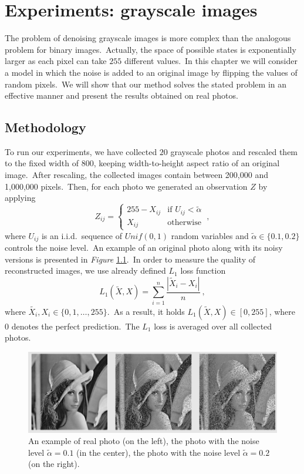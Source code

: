 \documentclass[shortabstract, english, lic]{iithesis}
\newcommand\numberedchapter[1]{\setlength\topskip{3cm}\chapter{#1}\setlength\topskip{0cm}}
\theoremstyle{default_theorem_style}\newtheorem{theorem}{Theorem}
\theoremstyle{default_theorem_style}\newtheorem{definition}{Definition}
\begin{document}
\numberedchapter{Experiments: grayscale images}\label{chapter:grayscale_experiments}

The problem of denoising grayscale images is more complex than the analogous problem for binary
images.\ Actually, the space of possible states is exponentially larger as each pixel can take $255$ different
values.\ In this chapter we will consider a model in which the noise is added to an original image by flipping
the values of random pixels.\ We will show that our method solves the stated problem in an effective manner
and present the results obtained on real photos.

\section{Methodology}

To run our experiments, we have collected $20$ grayscale photos and rescaled them to the fixed width of $800$,
keeping width-to-height aspect ratio of an original image.\ After rescaling, the collected images contain between
200,000 and 1,000,000 pixels.\ Then, for each photo we generated an observation $Z$ by applying
$$
Z_{ij} =
\begin{cases}
  255 - X_{ij} &\text{if $U_{ij} < \tilde{\alpha}$}\\
  X_{ij} &\text{otherwise}
\end{cases}\ ,
$$
where $U_{ij}$ is an i.i.d.\ sequence of $Unif(0, 1)$ random variables and $\tilde{\alpha} \in \{0.1, 0.2\}$ controls
the noise level.\ An example of an original photo along with its noisy versions is presented
in \textit{Figure} \ref{fig:grayscale_data_examples}.\ In order to measure the quality of reconstructed images,
we use already defined $L_1$ loss function
$$
L_1(\tilde{X}, X) = \sum\limits_{i = 1}^n \frac{|\tilde{X}_i - X_i|}{n}\ ,
$$
where $\tilde{X_i}, X_i \in \{0, 1,  \dots, 255\}$.\ As a result, it holds $L_1(\tilde{X}, X) \in [0,255]$, where 0
denotes the perfect prediction.\ The $L_1$ loss is averaged over all collected
photos.\newline\newline\newline\newline\newline

\begin{figure}[H]
\centering
\includegraphics[scale=0.43]{grayscale_data_examples}
\caption{An example of real photo (on the left), the photo with the noise level $\tilde{\alpha} = 0.1$
(in the center), the photo with the noise level $\tilde{\alpha} = 0.2$ (on the right).}
\label{fig:grayscale_data_examples}
\end{figure}
\end{document}
